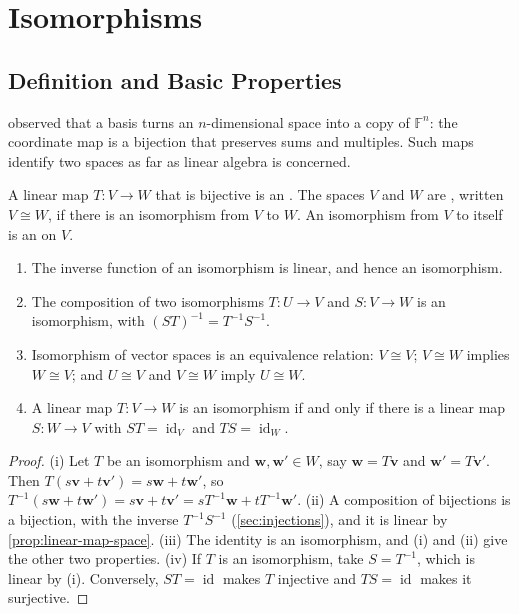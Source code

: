 \section{Isomorphisms}
\label{sec:isomorphisms}

\subsection{Definition and Basic Properties}

 observed that a basis turns an $n$-dimensional space into a copy of $\mathbb F^n$: the coordinate map is a bijection that preserves sums and multiples. Such maps identify two spaces as far as linear algebra is concerned.

\begin{definition}[Isomorphism]
\label{def:isomorphism}
A linear map $T\colon V\to W$ that is bijective is an . The spaces $V$ and $W$ are , written $V\cong W$, if there is an isomorphism from $V$ to $W$. An isomorphism from $V$ to itself is an  on $V$.
\end{definition}

\begin{proposition}
\label{prop:isomorphism}
\leavevmode
\begin{enumerate}
\item The inverse function of an isomorphism is linear, and hence an isomorphism.
\item The composition of two isomorphisms $T\colon U\to V$ and $S\colon V\to W$ is an isomorphism, with $(ST)^{-1}=T^{-1}S^{-1}$.
\item Isomorphism of vector spaces is an equivalence relation: $V\cong V$; $V\cong W$ implies $W\cong V$; and $U\cong V$ and $V\cong W$ imply $U\cong W$.
\item A linear map $T\colon V\to W$ is an isomorphism if and only if there is a linear map $S\colon W\to V$ with $ST=\operatorname{id}_V$ and $TS=\operatorname{id}_W$.
\end{enumerate}
\end{proposition}

\begin{proof}
(i) Let $T$ be an isomorphism and $\mathbf w,\mathbf w'\in W$, say $\mathbf w=T\mathbf v$ and $\mathbf w'=T\mathbf v'$. Then $T(s\mathbf v+t\mathbf v')=s\mathbf w+t\mathbf w'$, so $T^{-1}(s\mathbf w+t\mathbf w')=s\mathbf v+t\mathbf v'=sT^{-1}\mathbf w+tT^{-1}\mathbf w'$. (ii) A composition of bijections is a bijection, with the inverse $T^{-1}S^{-1}$ (\cref{sec:injections}), and it is linear by \cref{prop:linear-map-space}. (iii) The identity is an isomorphism, and (i) and (ii) give the other two properties. (iv) If $T$ is an isomorphism, take $S=T^{-1}$, which is linear by (i). Conversely, $ST=\operatorname{id}$ makes $T$ injective and $TS=\operatorname{id}$ makes it surjective.
\end{proof}

